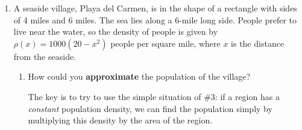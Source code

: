 \documentclass[main]{subfiles}
\begin{document}
\begin{enumerate}
\item 
  A seaside village, Playa del Carmen, is in the shape of a rectangle with
  sides of 4 miles and 6 miles.  The sea lies along a 6-mile long side.
  People prefer to live near the water, so the density of people is given
  by $\rho(x) = 1000 (20 - x^2)$ people per square mile, where $x$ is the
  distance from the seaside.

  \begin{enumerate}
  \item 

    \begin{problem}[\vfill]
      How could you \textbf{approximate} the population of the
      village?
    \end{problem}

    \begin{solution}
      The key is to try to use the simple situation of
      {{\#3}}: if a region has a \textit{constant}
      population density, we can find the population simply by multiplying
      this density by the area of the region.


\end{solution}
\end{enumerate}
\end{enumerate}
\end{document}
